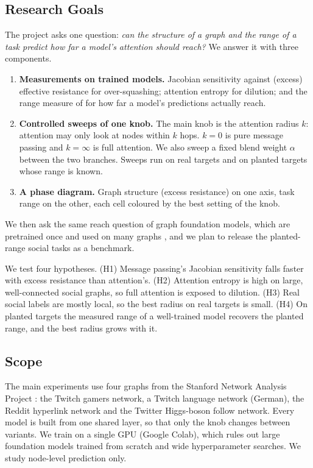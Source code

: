 \subsection{Research Goals}
The project asks one question: \emph{can the structure of a graph and the range of a task predict how far a model's attention should reach?} We answer it with three components.
\begin{enumerate}
\item \textbf{Measurements on trained models.} Jacobian sensitivity against (excess) effective resistance for over-squashing; attention entropy for dilution; and the range measure of \citet{bamberger2025} for how far a model's predictions actually reach.
\item \textbf{Controlled sweeps of one knob.} The main knob is the attention radius $k$: attention may only look at nodes within $k$ hops. $k=0$ is pure message passing and $k=\infty$ is full attention. We also sweep a fixed blend weight $\alpha$ between the two branches. Sweeps run on real targets and on planted targets whose range is known.
\item \textbf{A phase diagram.} Graph structure (excess resistance) on one axis, task range on the other, each cell coloured by the best setting of the knob.
\end{enumerate}
We then ask the same reach question of graph foundation models, which are pretrained once and used on many graphs \citep{f_gutteridge2026,f_eremeev2026}, and we plan to release the planted-range social tasks as a benchmark.

We test four hypotheses. (H1) Message passing's Jacobian sensitivity falls faster with excess resistance than attention's. (H2) Attention entropy is high on large, well-connected social graphs, so full attention is exposed to dilution. (H3) Real social labels are mostly local, so the best radius on real targets is small. (H4) On planted targets the measured range of a well-trained model recovers the planted range, and the best radius grows with it.

\subsection{Scope}
The main experiments use four graphs from the Stanford Network Analysis Project \citep{f_leskovec2014}: the Twitch gamers network, a Twitch language network (German), the Reddit hyperlink network and the Twitter Higgs-boson follow network. Every model is built from one shared layer, so that only the knob changes between variants. We train on a single GPU (Google Colab), which rules out large foundation models trained from scratch and wide hyperparameter searches. We study node-level prediction only.

